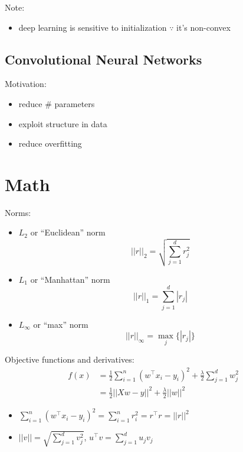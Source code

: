 \documentclass[10pt,landscape,a4paper]{article}
\begin{document}
\begin{multicols*}{5}
Note:
\begin{itemize}
    \item deep learning is sensitive to initialization \(\because\) it's non-convex
\end{itemize}

\subsection{Convolutional Neural Networks}
Motivation:
\begin{itemize}
    \item reduce \# parameters
    \item exploit structure in data
    \item reduce overfitting
\end{itemize}

\section{Math}
Norms:
\begin{itemize}
    \item \(L_2\) or ``Euclidean'' norm
    \begin{equation*}
         ||r||_2 = \sqrt{\sum_{j=1}^{d} r_j^2}
    \end{equation*}
    \item \(L_1\) or ``Manhattan'' norm
    \begin{equation*}
        ||r||_1 = \sum_{j=1}^{d} |r_j|
    \end{equation*}
    \item \(L_{\infty}\) or ``max'' norm
    \begin{equation*}
        ||r||_{\infty} = \max_j{\{|r_j|}\}
    \end{equation*}
\end{itemize}
Objective functions and derivatives:
\begin{align*}
   f(x) &= \frac{1}{2}\sum\limits_{i=1}^{n} (w^\intercal x_i - y_i)^2 + \frac{\lambda}{2} \sum\limits_{j=1}^{d} w_j^2 \\
   &= \frac{1}{2} ||Xw-y||^2 + \frac{\lambda}{2} ||w||^2
\end{align*}
\begin{itemize}
    \item \(\sum\limits_{i=1}^{n} (w^\intercal x_i - y_i)^2 = \sum\limits_{i=1}^{n} r_i^2 = r^\intercal r = ||r||^2\)
    \item \(||v|| = \sqrt{\sum\limits_{j=1}^{d} v_j^2}\), \(u^\intercal v = \sum\limits_{j=1}^{d} u_j v_j\)

\end{itemize}
\end{multicols*}
\end{document}
